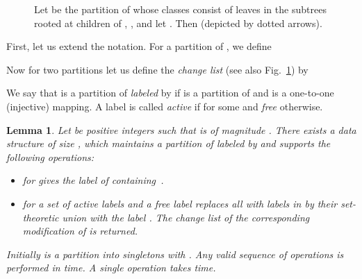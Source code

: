 \documentclass{article}
\theoremstyle{theorem}
\newtheorem{lemma}{Lemma}
\theoremstyle{definition}
\begin{document}
\begin{figure}[ht]
\clearpage{}
      \caption{
        Let  be the partition of  whose classes
        consist of leaves in the subtrees rooted at children of ,
        ,
        and let .
        Then 
        (depicted by dotted arrows).
      }\label{fig:ChangeList}
    \end{figure}
  First, let us extend the  notation.
  For a partition  of , we
  define
  
  Now for two partitions  let us define the \emph{change list} (see also Fig.~\ref{fig:ChangeList}) by
  

 \newcommand{\id}{id}
 We say that  is a partition of  \emph{labeled} by  if  is a partition of  and 
  is a one-to-one (injective) mapping.
 A label  is called \emph{active} if  for some  and \emph{free} otherwise.
 \begin{lemma}\label{lem:main_data_structure}
    Let  be positive integers such that  is of magnitude .
    There exists a data structure of size , which maintains a partition   of 
    labeled by  and supports the following operations:
    \begin{itemize}
      \item  for  gives the label of  containing~.
      \item  for a set  of active labels and a free label
       replaces all  with labels in  by their set-theoretic union with the label .
      The change list of the corresponding modification of  is returned.
    \end{itemize}
    Initially  is a partition into singletons with .
    Any valid sequence of  operations is performed in  time.
    A single  operation takes  time.
  \end{lemma}
 
\end{document}
